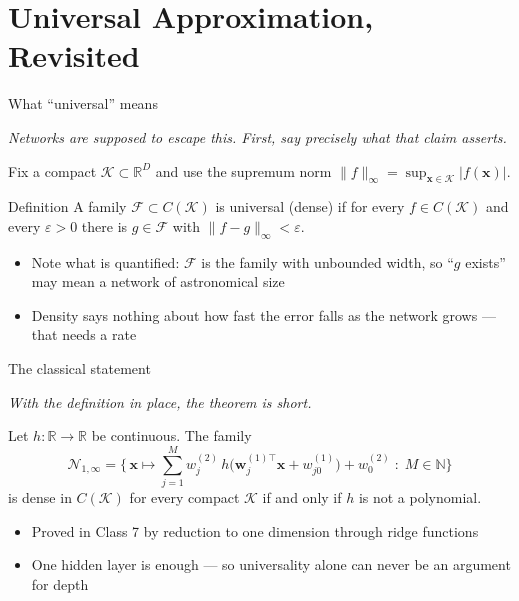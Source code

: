 \documentclass[aspectratio=169, 11pt]{beamer}
\newcommand{\bridge}[1]{%
  {\scriptsize\itshape\color{mcMuted} #1\par}\vspace{0.35em}}
\newcommand{\src}[3]{}      %
\newcommand{\nosrc}{}       %
\begin{document}
\section{Universal Approximation, Revisited}

\begin{frame}{What ``universal'' means}
  \nosrc
  \bridge{Networks are supposed to escape this. First, say precisely
  what that claim asserts.}
  Fix a compact $\mathcal{K}\subset\mathbb{R}^{D}$ and use the supremum
  norm $\lVert f\rVert_\infty=\sup_{\mathbf{x}\in\mathcal{K}}
  |f(\mathbf{x})|$.
  \vfill
  \begin{block}{Definition}
    {\small A family $\mathcal{F}\subset C(\mathcal{K})$ is
    \alert{universal} (dense) if for every $f\in C(\mathcal{K})$ and
    every $\varepsilon>0$ there is $g\in\mathcal{F}$ with
    $\lVert f-g\rVert_\infty<\varepsilon$.}
  \end{block}
  \vfill
  {\small
  \begin{itemize}\setlength{\itemsep}{3pt}
    \item Note what is quantified: $\mathcal{F}$ is the family with
          \alert{unbounded} width, so ``$g$ exists'' may mean a network
          of astronomical size
    \item Density says nothing about \alert{how fast} the error falls
          as the network grows --- that needs a \alert{rate}
  \end{itemize}}
\end{frame}

\begin{frame}{The classical statement}
  \src{leshno1993}{section}{4}
  \src{cybenko1989}{section}{3}
  \src{hornik1991}{section}{2}
  \bridge{With the definition in place, the theorem is short.}
  \begin{theorem}
    {\small Let $h:\mathbb{R}\to\mathbb{R}$ be continuous. The family
    \[
      \mathcal{N}_{1,\infty}
      = \Big\{\,\mathbf{x}\mapsto \sum_{j=1}^{M} w^{(2)}_j\,
        h\big(\mathbf{w}_j^{(1)\top}\mathbf{x}+w^{(1)}_{j0}\big)
        + w^{(2)}_0 \;:\; M\in\mathbb{N} \Big\}
    \]
    is dense in $C(\mathcal{K})$ for every compact $\mathcal{K}$
    \alert{if and only if $h$ is not a polynomial}.}
  \end{theorem}
  \vspace{-0.05em}
  {\footnotesize
  \begin{itemize}\setlength{\itemsep}{0pt}
    \item Proved in Class 7 by reduction to one dimension through
          \alert{ridge functions}
    \item \alert{One hidden layer is enough} --- so universality alone
          can never be an argument for depth
  \end{itemize}}
\end{frame}
\end{document}
